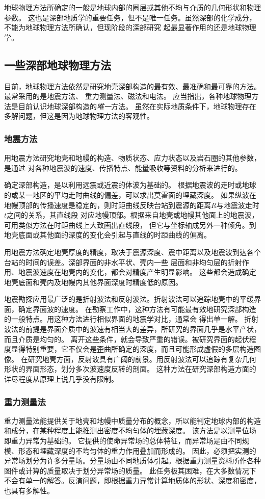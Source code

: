 \documentclass[hyperref,UTF-8]{ctexart}
\begin{document}
地球物理方法所确定的一般是地球内部的圈层或其他不均与介质的几何形状和物理参数。
这也是深部地质学的重要任务，但不是唯一任务。虽然深部的化学成分，不能为地球物理方法所确认，但现阶段的深部研究
起最显著作用的还是地球物理学。
\subsection{一些深部地球物理方法}
目前，地球物理方法依然是研究地壳深部构造的最有效、最准确和最可靠的方法。最常采用的是地震方法、
重力测量法、磁法和电法。
应当指出，各种地球物理方法是目前认识地球深部构造的\emph{唯一}方法。
虽然在实际地质条件下，地球物理存在多解问题，但这是因为地球物理方法的客观性。
\subsubsection{地震方法}
用地震方法研究地壳和地幔的构造、物质状态、应力状态以及岩石圈的其他参数，是通过
对各种地震波的速度、传播特点、能量吸收等资料的分析来进行的。

确定深部构造，是以利用远震或近震的体波为基础的。
根据地震波的走时或地球的或某一地区的平均走时曲线的偏差，可以求出莫霍面的埋藏深度。
如果纵波在地幔顶部的传播速度是稳定的，则时距曲线反映台站到震源的距离$R$与地震波走时$t$之间的关系，其直线段
对应地幔顶部。根据来自地壳或地幔其他面上的地震波，可用类似方法在时距曲线上大致画出直线段，
但它与坐标轴成另外一种倾角。到地壳底面或其他面的深度的变化会引起与直线的时距曲线的偏离。

用地震方法确定地壳厚度的精度，取决于震源深度、震中距离以及地震波到达各个台站的时间的误差。深部界面的非水平状、壳内一些
层面和非均匀层的折射作用、地震波速度在地壳内的变化，都会对精度产生明显影响。
这些都会造成确定地壳底面和壳内及地幔内其他界面深度时精度低的原因。

地震勘探应用最广泛的是折射波法和反射波法。折射波法可以追踪地壳中的平缓界面，确定界面波的速度。
在勘察工作中，这种方法有可能最有效地研究深部构造的一般特点。用这种方法进行相似界面的地震学对比，通常会
得出单一解。
折射波法的前提是界面介质中的波速有相当大的差异，所研究的界面几乎是水平产状，而且介质是均匀的。
离开这些条件，就会导致严重的错误。被研究界面的起伏程度显得特别重要，它不仅会是歪曲所确定的深度，而且可能形成虚假的多层构造图像。
在研究地壳方面，反射波具有广阔的前景。用反射波法可以追踪有复杂几何形状的界面形态，划分多次波速度反转的剖面。
这种方法在研究深部构造方面的详尽程度从原理上说几乎没有限制。
\subsubsection{重力测量法}
重力测量法能提供关于地壳和地幔中质量分布的概念，所以能判定地球内部的构造和成分，在某种程度上能推测出密度不均匀体的埋藏深度。
该方法是以测量位场即重力异常为基础的。
它提供的使命异常场的总体特征，而异常场是由不同规模、形态和埋藏深度的不均匀体的重力作用叠加而形成的。
因此，必须把实测的异常场划分为许多分量场。分量场由不同地质体引起。根据重力测量资料所作各种图件或计算的质量取决于划分异常场的质量。
此任务极其困难，在大多数情况下不会有单一的解答。反演问题，即根据重力异常计算地质体的形状、深度和密度，也具有多解性。
\end{document}
